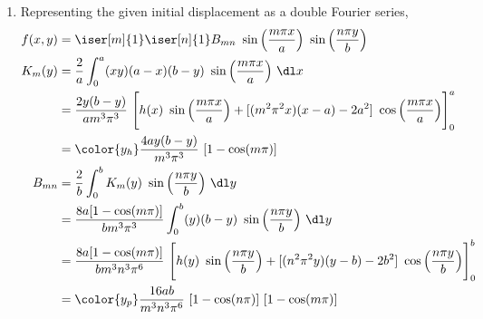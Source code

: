 \begin{enumerate}
    \item Representing the given initial displacement as a double Fourier series,
          \begin{align}
              f(x, y) & = \iser[m]{1} \iser[n]{1} B_{mn}\ \sin\Big( \frac{m\pi x }{a}
              \Big)\ \sin\Big( \frac{n\pi y }{b}\Big)                                 \\
              K_m(y)  & = \frac{2}{a} \int_{0}^{a} (xy)(a-x)(b-y)\ \sin\Big(
              \frac{m\pi x }{a}\Big)\ \dl x                                           \\
                      & = \frac{2y(b-y)}{a m^3 \pi^3}\ \Bigg[ h(x)
              \ \sin\Big( \frac{m\pi x }{a} \Big)
              + [(m^2\pi^2 x)(x-a) - 2a^2]\ \cos\Big( \frac{m\pi x }{a} \Big)
              \Bigg]_0^a                                                              \\
                      & = \color{y_h} \frac{4ay(b-y)}{m^3\pi^3}
              \ [1 - \cos(m\pi)]                                                      \\
              B_{mn}  & = \frac{2}{b} \int_{0}^{b} K_m(y)\ \sin\Big(\frac{n\pi y }{b}
              \Big)\ \dl y                                                            \\
                      & = \frac{8a[1 - \cos(m\pi)]}{bm^3\pi^3}
              \int_{0}^{b} (y)(b-y)\ \sin\Big( \frac{n\pi y }{b}\Big)\ \dl y          \\
                      & = \frac{8a[1 - \cos(m\pi)]}{bm^3n^3\pi^6}
              \ \Bigg[ h(y)\ \sin\Big( \frac{n\pi y }{b} \Big)
              + [(n^2\pi^2 y)(y-b) - 2b^2]\ \cos\Big( \frac{n\pi y }{b} \Big)
              \Bigg]_0^b                                                              \\
                      & = \color{y_p} \frac{16ab}{m^3n^3\pi^6}
              \ [1 - \cos(n\pi)]\ [1 - \cos(m\pi)]
          \end{align}


\end{enumerate}
